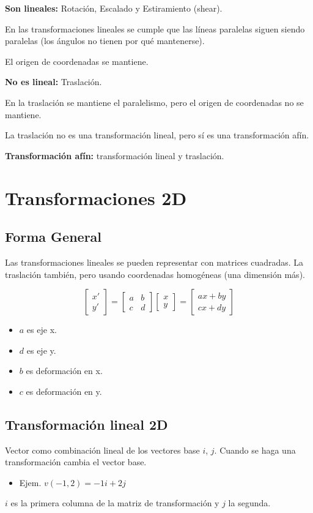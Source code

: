 \textbf{Son lineales:} Rotación, Escalado y Estiramiento (shear).

En las transformaciones lineales se cumple que las líneas paralelas siguen siendo paralelas (los ángulos no tienen por qué mantenerse).

El origen de coordenadas se mantiene.

\textbf{No es lineal:} Traslación.

En la traslación se mantiene el paralelismo, pero el origen de coordenadas no se mantiene.

La traslación no es una transformación lineal, pero sí es una transformación afín.

\textbf{Transformación afín:} transformación lineal y traslación.

\section{Transformaciones 2D}
\subsection{Forma General}
Las transformaciones lineales se pueden representar con matrices cuadradas. La traslación también, pero usando coordenadas homogéneas (una dimensión más).

$$\left[\begin{matrix}
			x' \\ y'
		\end{matrix}\right] =
	\left[\begin{matrix}
			a & b \\ c & d
		\end{matrix}\right]
	\left[\begin{matrix}
			x \\ y
		\end{matrix}\right]=
	\left[\begin{matrix}
			ax+by \\ cx+dy
		\end{matrix}\right]$$
\begin{itemize}
	\item $a$ es eje x.
	\item $d$ es eje y.
	\item $b$ es deformación en x.
	\item $c$ es deformación en y.
\end{itemize}

\subsection{Transformación lineal 2D}
Vector como combinación lineal de los vectores base $i$, $j$. Cuando se haga una transformación cambia el vector base.
\begin{itemize}
	\item Ejem. $v (-1,2) = -1 i + 2 j$
\end{itemize}
$i$ es la primera columna de la matriz de transformación y $j$ la segunda.

